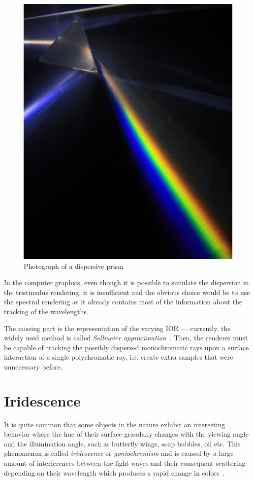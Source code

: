 \begin{figure}[h]
	\centering
	\includegraphics[width=.6\linewidth]{img/dispersion.jpg}
	\caption[nikon]{Photograph of a dispersive prism\footnotemark}
	\label{fig:dispersion}
\end{figure}

In the computer graphics, even though it is possible to simulate the dispersion in the tristimulus rendering, it is insufficient and the obvious choice would be to use the spectral rendering as it already contains most of the information about the tracking of the wavelengths. 

The missing part is the representation of the varying IOR --- currently, the widely used method is called \emph{Sellmeier approximation}~\cite{wilkie2002tone}. Then, the renderer must be capable of tracking the possibly dispersed monochromatic rays upon a surface interaction of a single polychromatic ray, i.e. create extra samples that were unnecessary before.

\section{Iridescence}
\label{sec:irid}

It is quite common that some objects in the nature exhibit an interesting behavior where the hue of their surface graudally changes with the viewing angle and the illumination angle, such as butterfly wings, soap bubbles, oil etc. This phenomenon is called \emph{iridescence} or \emph{goniochromism} and is caused by a large amount of interferences between the light waves and their consequent scattering depending on their wavelength which produces a rapid change in colors~\cite{belcour2017practical}.

